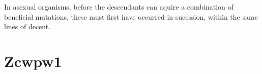 \begin{savequote}[8cm]
In asexual organisms, before the descendants can aquire a combination of beneficial mutations, these must first have occurred in sucession, within the same lines of decent.
\end{savequote}

\chapter{\label{app:1-A}Zcwpw1}

\minitoc

